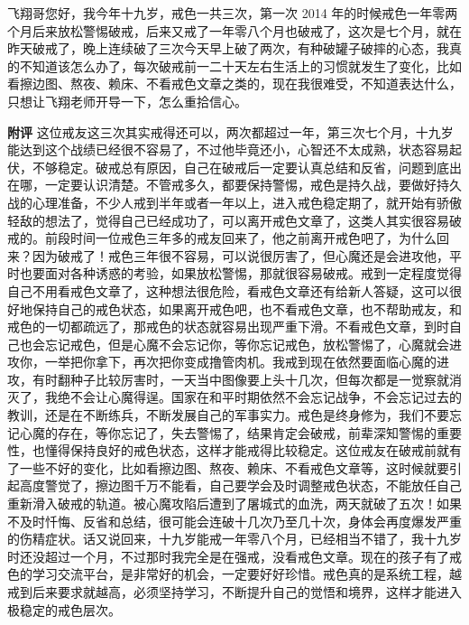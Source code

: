 \begin{case}
    飞翔哥您好，我今年十九岁，戒色一共三次，第一次 2014 年的时候戒色一年零两个月后来放松警惕破戒，后来又戒了一年零八个月也破戒了，这次是七个月，就在昨天破戒了，晚上连续破了三次今天早上破了两次，有种破罐子破摔的心态，我真的不知道该怎么办了，每次破戒前一二十天左右生活上的习惯就发生了变化，比如看擦边图、熬夜、赖床、不看戒色文章之类的，现在我很难受，不知道表达什么，只想让飞翔老师开导一下，怎么重拾信心。

    \textbf{附评} 这位戒友这三次其实戒得还可以，两次都超过一年，第三次七个月，十九岁能达到这个战绩已经很不容易了，不过他毕竟还小，心智还不太成熟，状态容易起伏，不够稳定。破戒总有原因，自己在破戒后一定要认真总结和反省，问题到底出在哪，一定要认识清楚。不管戒多久，都要保持警惕，戒色是持久战，要做好持久战的心理准备，不少人戒到半年或者一年以上，进入戒色稳定期了，就开始有骄傲轻敌的想法了，觉得自己已经成功了，可以离开戒色文章了，这类人其实很容易破戒的。前段时间一位戒色三年多的戒友回来了，他之前离开戒色吧了，为什么回来？因为破戒了！戒色三年很不容易，可以说很厉害了，但心魔还是会进攻他，平时也要面对各种诱惑的考验，如果放松警惕，那就很容易破戒。戒到一定程度觉得自己不用看戒色文章了，这种想法很危险，看戒色文章还有给新人答疑，这可以很好地保持自己的戒色状态，如果离开戒色吧，也不看戒色文章，也不帮助戒友，和戒色的一切都疏远了，那戒色的状态就容易出现严重下滑。不看戒色文章，到时自己也会忘记戒色，但是心魔不会忘记你，等你忘记戒色，放松警惕了，心魔就会进攻你，一举把你拿下，再次把你变成撸管肉机。我戒到现在依然要面临心魔的进攻，有时翻种子比较厉害时，一天当中图像要上头十几次，但每次都是一觉察就消灭了，我绝不会让心魔得逞。国家在和平时期依然不会忘记战争，不会忘记过去的教训，还是在不断练兵，不断发展自己的军事实力。戒色是终身修为，我们不要忘记心魔的存在，等你忘记了，失去警惕了，结果肯定会破戒，前辈深知警惕的重要性，也懂得保持良好的戒色状态，这样才能戒得比较稳定。这位戒友在破戒前就有了一些不好的变化，比如看擦边图、熬夜、赖床、不看戒色文章等，这时候就要引起高度警觉了，擦边图千万不能看，自己要学会及时调整戒色状态，不能放任自己重新滑入破戒的轨道。被心魔攻陷后遭到了屠城式的血洗，两天就破了五次！如果不及时忏悔、反省和总结，很可能会连破十几次乃至几十次，身体会再度爆发严重的伤精症状。话又说回来，十九岁能戒一年零八个月，已经相当不错了，我十九岁时还没超过一个月，不过那时我完全是在强戒，没看戒色文章。现在的孩子有了戒色的学习交流平台，是非常好的机会，一定要好好珍惜。戒色真的是系统工程，越戒到后来要求就越高，必须坚持学习，不断提升自己的觉悟和境界，这样才能进入极稳定的戒色层次。
\end{case}

